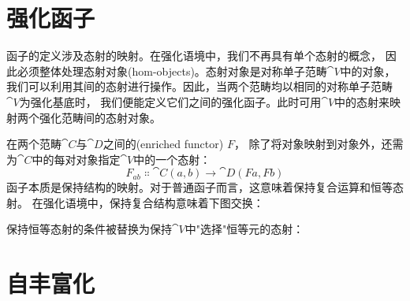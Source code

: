 \section{强化函子}

函子的定义涉及态射的映射。在强化语境中，我们不再具有单个态射的概念，
因此必须整体处理态射对象(hom-objects)。态射对象是对称单子范畴$\cat{V}$中的对象，
我们可以利用其间的态射进行操作。因此，当两个范畴均以相同的对称单子范畴$\cat{V}$为强化基底时，
我们便能定义它们之间的强化函子。此时可用$\cat{V}$中的态射来映射两个强化范畴间的态射对象。

在两个范畴$\cat{C}$与$\cat{D}$之间的(enriched functor) $F$，
除了将对象映射到对象外，还需为$\cat{C}$中的每对对象指定$\cat{V}$中的一个态射：
$$F_{a b} \Colon \cat{C}(a, b) \to \cat{D}(F a, F b)$$
函子本质是保持结构的映射。对于普通函子而言，这意味着保持复合运算和恒等态射。
在强化语境中，保持复合结构意味着下图交换：

\begin{figure}[H]
  \centering
\end{figure}

\noindent
保持恒等态射的条件被替换为保持$\cat{V}$中"选择"恒等元的态射：

\begin{figure}[H]
  \centering
\end{figure}

\section{自丰富化}

